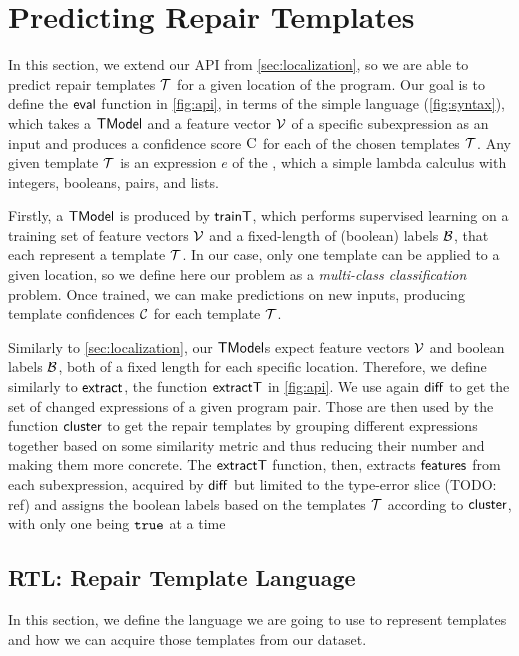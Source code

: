 \section{Predicting Repair Templates}
\label{sec:templ-pred}

In this section, we extend our API from \autoref{sec:localization}, so we are
able to predict repair templates $\mathcal{T}$ for a given location of the program. Our
goal is to define the $\mathsf{eval}$ function in \autoref{fig:api}, in terms of the
simple language \repairLang (\autoref{fig:syntax}), which takes a $\mathsf{TModel}$ and
a feature vector $\mathcal{V}$ of a specific subexpression as an input and produces a
confidence score $\textsc{C}$ for each of the chosen templates $\mathcal{T}$. Any given template
$\mathcal{T}$ is an expression $e$ of the \repairLang, which a simple lambda calculus
with integers, booleans, pairs, and lists.

Firstly, a $\mathsf{TModel}$ is produced by $\mathsf{trainT}$, which performs supervised
learning on a training set of feature vectors $\mathcal{V}$ and a fixed-length of
(boolean) labels $\mathcal{B}$, that each represent a template $\mathcal{T}$. In our case, only
one template can be applied to a given location, so we define here our problem
as a \emph{multi-class classification} problem. Once trained, we can make
predictions on new inputs, producing template confidences $\mathcal{C}$ for each
template $\mathcal{T}$.

Similarly to \autoref{sec:localization}, our $\mathsf{TModel}$s expect feature vectors
$\mathcal{V}$ and boolean labels $\mathcal{B}$, both of a fixed length for each specific location.
Therefore, we define similarly to $\mathsf{extract}$, the function $\mathsf{extractT}$ in
\autoref{fig:api}. We use again $\mathsf{diff}$ to get the set of changed expressions
of a given program pair. Those are then used by the function $\mathsf{cluster}$ to
get the repair templates by grouping different expressions together based on
some similarity metric and thus reducing their number and making them more
concrete. The $\mathsf{extractT}$ function, then, extracts $\mathsf{features}$ from each
subexpression, acquired by $\mathsf{diff}$ but limited to the type-error slice (TODO:
ref) and assigns the boolean labels based on the templates $\mathcal{T}$ according to
$\mathsf{cluster}$, with only one being $\mathtt{true}$ at a time


\subsection{RTL: Repair Template Language}
\label{subsec:lang}

In this section, we define the language we are going to use to represent
templates and how we can acquire those templates from our dataset.

